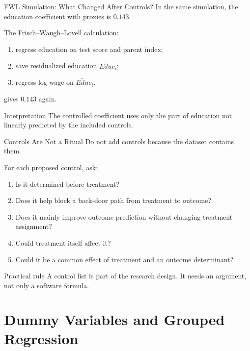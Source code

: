 \documentclass[11pt,aspectratio=169]{beamer}
\begin{document}
\begin{frame}{FWL Simulation: What Changed After Controls?}
  In the same simulation, the education coefficient with proxies is \(0.143\).
  \vspace{0.4em}

  The Frisch--Waugh--Lovell calculation:
  \begin{enumerate}
    \item regress education on test score and parent index;
    \item save residualized education \(\tilde{Educ}_i\);
    \item regress log wage on \(\tilde{Educ}_i\).
  \end{enumerate}
  gives \(0.143\) again.
  \vspace{0.4em}
  \begin{block}{Interpretation}
    The controlled coefficient uses only the part of education not linearly predicted by the included controls.
  \end{block}
\end{frame}

\begin{frame}{Controls Are Not a Ritual}
  Do not add controls because the dataset contains them.
  \vspace{0.3em}

  For each proposed control, ask:
  \begin{enumerate}
    \item Is it determined before treatment?
    \item Does it help block a back-door path from treatment to outcome?
    \item Does it mainly improve outcome prediction without changing treatment assignment?
    \item Could treatment itself affect it?
    \item Could it be a common effect of treatment and an outcome determinant?
  \end{enumerate}
  \begin{block}{Practical rule}
    A control list is part of the research design. It needs an argument, not only a software formula.
  \end{block}
\end{frame}

\section{Dummy Variables and Grouped Regression}
\end{document}
